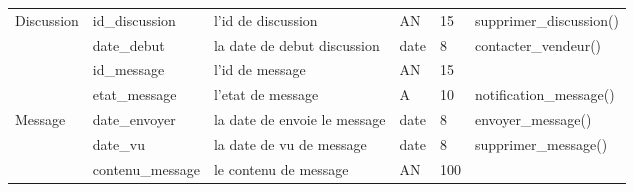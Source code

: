 \documentclass[edit,12pt,a4paper,ChapStyle,oneside,doubleinterligne]{report}
\begin{document}
\begin{table}[H]
\begin{tabular}{ | m{} | m{}| m{3cm} |m{}|m{}|l|}
                            Discussion  &id\_discussion&l'id de discussion&AN&15&supprimer\_discussion() \\\cline{2-5}
                                        &date\_debut&la date de debut discussion&date&8&contacter\_vendeur()\\\hline

                                        &id\_message&l'id de message&AN&15& \\\cline{2-5}
                                        &etat\_message&l'etat de message&A&10&notification\_message() \\\cline{2-5}
                              Message   &date\_envoyer&la date de envoie le message&date&8&envoyer\_message() \\\cline{2-5}
                                        &date\_vu&la date de vu de message&date&8&supprimer\_message() \\\cline{2-5}
                                        &contenu\_message&le contenu de message&AN&100& \\\hline


 \end{tabular}
\end{table}
\end{document}
